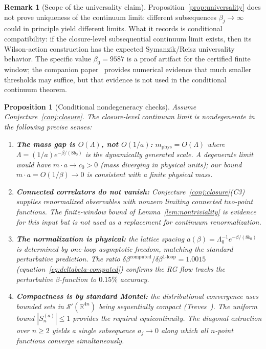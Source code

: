 \documentclass[11pt]{article}
\newtheorem{proposition}[theorem]{Proposition}
\theoremstyle{definition}
\newtheorem{remark}[theorem]{Remark}
\newcommand{\R}{\mathbb{R}}
\begin{document}
\begin{remark}[Scope of the universality claim]%
\label{rem:universality}
Proposition~\ref{prop:universality} does
not prove uniqueness of the continuum limit:
different subsequences $\beta_j\to\infty$ could in principle
yield different limits.  What it records is conditional compatibility: if the closure-level subsequential continuum limit exists, then its Wilson-action construction has the expected Symanzik/Reisz universality behavior.
The specific value $\beta_0=9587$ is a proof artifact for the certified finite window; the companion paper~\cite{companion} provides numerical evidence that much smaller thresholds may suffice, but that evidence is not used in the conditional continuum theorem.
\end{remark}

\begin{proposition}[Conditional nondegeneracy checks]%
\label{prop:nondegen}
Assume Conjecture~\ref{conj:closure}.  The closure-level continuum limit
is nondegenerate in the following precise senses:
\begin{enumerate}[nosep,label=\textup{(\roman*)}]
\item \textbf{The mass gap is $O(\Lambda)$, not $O(1/a)$:}
$m_{\mathrm{phys}}=O(\Lambda)$ where
$\Lambda=(1/a)e^{-\beta/(8b_0)}$ is the dynamically generated
scale.  A degenerate limit would have $m\cdot a\to c_0>0$
\textup{(}mass diverging in physical units\textup{)};
our bound $m\cdot a=O(1/\beta)\to 0$ is consistent with a
finite physical mass.
\item \textbf{Connected correlators do not vanish:}
Conjecture~\ref{conj:closure}(C3) supplies renormalized observables
with nonzero limiting connected two-point functions.  The finite-window
bound of Lemma~\ref{lem:nontriviality} is evidence for this input but
is not used as a replacement for continuum renormalization.
\item \textbf{The normalization is physical:}
the lattice spacing $a(\beta)=\Lambda_0^{-1}e^{-\beta/(8b_0)}$
is determined by one-loop asymptotic freedom, matching the
standard perturbative prediction.  The ratio
$\delta\beta^{\mathrm{computed}}/\delta\beta^{1\text{-loop}}
=1.0015$ \textup{(}equation~\eqref{eq:deltabeta-computed}\textup{)}
confirms the RG flow tracks the perturbative $\beta$-function
to $0.15\%$ accuracy.
\item \textbf{Compactness is by standard Montel:}
the distributional convergence uses bounded sets in
$\mathcal{S}'(\R^{4n})$ being sequentially compact
\textup{(}Treves~\cite{Treves}\textup{)}.
The uniform bound $|S_n^{(a)}|\le 1$ provides the required
equicontinuity.  The diagonal extraction over $n\ge 2$ yields
a single subsequence $a_j\to 0$ along which all
$n$-point functions converge simultaneously.
\end{enumerate}
\end{proposition}
\end{document}
